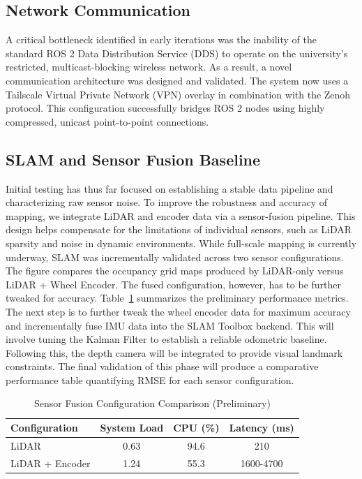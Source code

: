 \documentclass[journal,transmag]{IEEEtran}
\begin{document}
\subsection{Network Communication}
A critical bottleneck identified in early iterations was the inability of the standard ROS 2 Data Distribution Service (DDS) to operate on the university's restricted, multicast-blocking wireless network. As a result, a novel communication architecture was designed and validated. The system now uses a Tailscale Virtual Private Network (VPN) overlay in combination with the Zenoh protocol. This configuration successfully bridges ROS 2 nodes using highly compressed, unicast point-to-point connections.

\subsection{SLAM and Sensor Fusion Baseline}
Initial testing has thus far focused on establishing a stable data pipeline and characterizing raw sensor noise. To improve the robustness and accuracy of mapping, we integrate LiDAR and encoder data via a sensor-fusion pipeline. This design helps compensate for the limitations of individual sensors, such as LiDAR sparsity and noise in dynamic environments. While full-scale mapping is currently underway, SLAM was incrementally validated across two sensor configurations. The figure compares the occupancy grid maps produced by LiDAR-only versus LiDAR + Wheel Encoder. The fused configuration, however, has to be further tweaked for accuracy. Table~\ref{tab:slam} summarizes the preliminary performance metrics. The next step is to further tweak the wheel encoder data for maximum accuracy and incrementally fuse IMU data into the SLAM Toolbox backend. This will involve tuning the Kalman Filter to establish a reliable odometric baseline. Following this, the depth camera will be integrated to provide visual landmark constraints. The final validation of this phase will produce a comparative performance table quantifying RMSE for each sensor configuration. 

\begin{table}[H]
\centering
\caption{Sensor Fusion Configuration Comparison (Preliminary)}
\label{tab:slam}
\begin{tabular}{lccc}
\toprule
\textbf{Configuration} & \textbf{System Load} & \textbf{CPU (\%)} & \textbf{Latency (ms)} \\
\midrule
LiDAR             & 0.63 & 94.6 & 210 \\
LiDAR + Encoder        & 1.24 & 55.3 & 1600-4700 \\
\bottomrule
\end{tabular}
\end{table}
\end{document}
